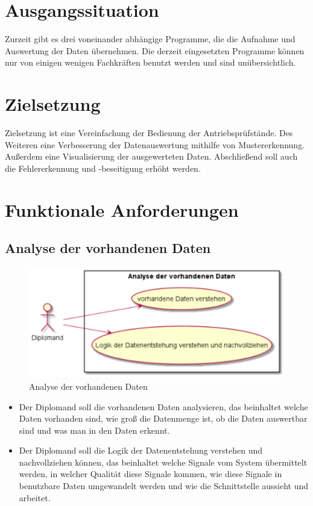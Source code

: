 \section{Ausgangssituation}
Zurzeit gibt es drei voneinander abhängige Programme, die die Aufnahme und Auswertung der Daten übernehmen. 
Die derzeit eingesetzten Programme können nur von einigen wenigen Fachkräften benutzt werden und sind unübersichtlich.

\section{Zielsetzung}
Zielsetzung ist eine Vereinfachung der Bedienung der Antriebsprüfstände. 
Des Weiteren eine Verbesserung der Datenauswertung mithilfe von Mustererkennung.
Außerdem eine Visualisierung der ausgewerteten Daten.
Abschließend soll auch die Fehlererkennung und -beseitigung erhöht werden.

\section{Funktionale Anforderungen}
\subsection{Analyse der vorhandenen Daten}  
\begin{figure}[h]
    \centering
    \includegraphics{pics/diplomand_anforderungen.png}
    \caption{Analyse der vorhandenen Daten}
    \label{fig:analyse}
\end{figure}

\begin{itemize}
    \item Der Diplomand soll die vorhandenen Daten analysieren, das beinhaltet welche Daten vorhanden sind, 
    wie groß die Datenmenge ist, ob die Daten auswertbar sind und was man in den Daten erkennt.
    \item Der Diplomand soll die Logik der Datenentstehung verstehen und nachvollziehen können, 
    das beinhaltet welche Signale vom System übermittelt werden, in welcher Qualität diese Signale kommen, 
    wie diese Signale in benutzbare Daten umgewandelt werden und wie die Schnittstelle aussieht und arbeitet.
\end{itemize}

